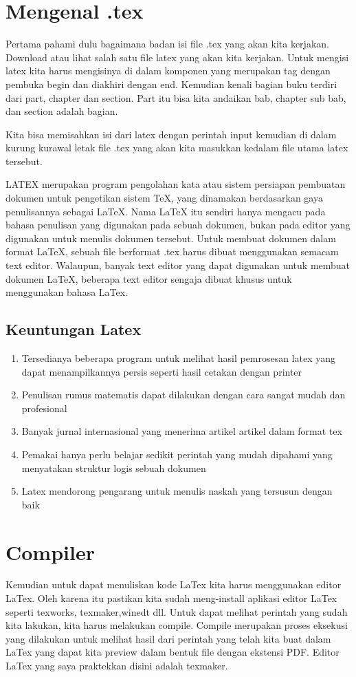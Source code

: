 \section{Mengenal .tex}
Pertama pahami dulu bagaimana badan isi file .tex yang akan kita kerjakan. Download atau lihat salah satu file latex yang akan kita kerjakan. Untuk mengisi latex kita harus mengisinya di dalam komponen  yang merupakan tag dengan pembuka begin dan diakhiri dengan end.
Kemudian kenali bagian buku terdiri dari part, chapter dan section. Part itu bisa kita andaikan bab, chapter sub bab, dan section adalah bagian.

Kita bisa memisahkan isi dari latex dengan perintah input kemudian di dalam kurung kurawal letak file .tex yang akan kita masukkan kedalam file utama latex tersebut.

LATEX merupakan program pengolahan kata atau sistem persiapan pembuatan dokumen untuk pengetikan sistem TeX, yang dinamakan berdasarkan gaya penulisannya sebagai LaTeX. Nama LaTeX itu sendiri hanya mengacu pada bahasa penulisan yang digunakan pada sebuah dokumen, bukan pada editor yang digunakan untuk menulis dokumen tersebut. Untuk membuat dokumen dalam format LaTeX, sebuah file berformat .tex harus dibuat menggunakan semacam text editor. Walaupun, banyak text editor yang dapat digunakan untuk membuat dokumen LaTeX, beberapa text editor sengaja dibuat khusus untuk menggunakan bahasa LaTex.
\subsection{Keuntungan Latex}
\begin{enumerate}
  \item Tersedianya beberapa program untuk melihat hasil pemrosesan latex yang dapat menampilkannya persis seperti hasil cetakan dengan printer
  \item Penulisan rumus matematis dapat dilakukan dengan cara sangat mudah dan profesional
  \item Banyak jurnal internasional yang menerima artikel artikel dalam format tex
  \item Pemakai hanya perlu belajar sedikit perintah yang mudah dipahami yang menyatakan struktur logis sebuah dokumen
  \item Latex mendorong pengarang untuk menulis naskah yang tersusun dengan baik
\end{enumerate}

\section{Compiler}
Kemudian untuk dapat menuliskan kode LaTex kita harus menggunakan editor LaTex. Oleh karena itu pastikan kita sudah meng-install aplikasi editor LaTex seperti texworks, texmaker,winedt dll. Untuk dapat melihat perintah yang sudah kita lakukan, kita harus melakukan compile. Compile merupakan proses eksekusi yang dilakukan untuk melihat hasil dari perintah yang telah kita buat dalam LaTex yang dapat kita preview dalam bentuk file dengan ekstensi PDF. Editor LaTex yang saya praktekkan disini adalah texmaker.


